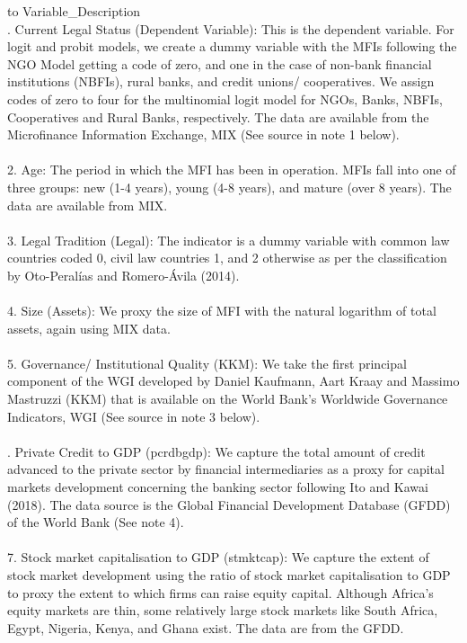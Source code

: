 \documentclass[a4paper,nobind]{templates/ociamthesis}
\begin{document}
\begin{table}

\caption{\label{tab:unnamed-chunk-7}Description of Variables}
\centering
\begin{tabu} to 
\toprule
Variable\_Description\\
. Current Legal Status (Dependent Variable): This is the dependent variable. For logit and probit models, we create a dummy variable with the MFIs following the NGO Model getting a code of zero, and one in the case of non-bank financial institutions (NBFIs), rural banks, and credit unions/ cooperatives. We assign codes of zero to four for the multinomial logit model for NGOs, Banks, NBFIs, Cooperatives and Rural Banks, respectively. The data are available from the Microfinance Information Exchange, MIX (See source in note 1 below).\\
\\
2.  Age: The period in which the MFI has been in operation. MFIs fall into one of three groups: new (1-4 years), young (4-8 years), and mature (over 8 years). The data are available from MIX.\\
\\
3. Legal Tradition (Legal): The indicator is a dummy variable with common law countries coded 0, civil law countries 1, and 2 otherwise as per the classification by Oto-Peralías and Romero-Ávila (2014).\\
\addlinespace
\\
4. Size (Assets): We proxy the size of MFI with the natural logarithm of total assets, again using MIX data.\\
\\
5. Governance/ Institutional Quality (KKM): We take the first principal component of the WGI developed by Daniel Kaufmann, Aart Kraay and Massimo Mastruzzi (KKM) that is available on the World Bank's Worldwide Governance Indicators, WGI (See source in note 3 below).\\
\\
. Private Credit to GDP (pcrdbgdp): We capture the total amount of credit advanced to the private sector by financial intermediaries as a proxy for capital markets development concerning the banking sector following Ito and Kawai (2018). The data source is the Global Financial Development Database (GFDD) of the World Bank (See note 4).\\
\\
7. Stock market capitalisation to GDP (stmktcap): We capture the  extent of stock market development using the ratio of stock market capitalisation to GDP to proxy the extent to which firms can raise equity capital. Although Africa's equity markets are thin, some relatively large stock markets like South Africa, Egypt, Nigeria, Kenya, and Ghana exist. The data are from the GFDD.\\

\end{tabu}
\end{table}
\end{document}

